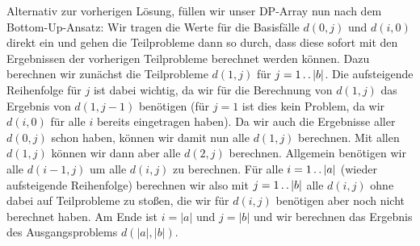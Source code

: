 \documentclass{whswinvcbook}
\begin{document}
Alternativ zur vorherigen Lösung, füllen wir unser DP-Array nun nach dem Bottom-Up-Ansatz: Wir tragen die Werte für die Basisfälle $d(0,j)$ und $d(i,0)$ direkt ein und gehen die Teilprobleme dann so durch, dass diese sofort mit den Ergebnissen der vorherigen Teilprobleme berechnet werden können. Dazu berechnen wir zunächst die Teilprobleme $d(1,j)$ für $j=1\mathinner{\ldotp\ldotp}|b|$. Die aufsteigende Reihenfolge für $j$ ist dabei wichtig, da wir für die Berechnung von $d(1,j)$ das Ergebnis von $d(1,j-1)$ benötigen (für $j=1$ ist dies kein Problem, da wir $d(i,0)$ für alle $i$ bereits eingetragen haben). Da wir auch die Ergebnisse aller $d(0,j)$ schon haben, können wir damit nun alle $d(1,j)$ berechnen. Mit allen $d(1,j)$ können wir dann aber alle $d(2,j)$ berechnen. Allgemein benötigen wir alle $d(i-1,j)$ um alle $d(i,j)$ zu berechnen. Für alle $i=1\mathinner{\ldotp\ldotp}|a|$ (wieder aufsteigende Reihenfolge) berechnen wir also mit $j=1\mathinner{\ldotp\ldotp}|b|$ alle $d(i,j)$ ohne dabei auf Teilprobleme zu stoßen, die wir für $d(i,j)$ benötigen aber noch nicht berechnet haben. Am Ende ist $i=|a|$ und $j=|b|$ und wir berechnen das Ergebnis des Ausgangsproblems $d(|a|,|b|)$.
\end{document}
